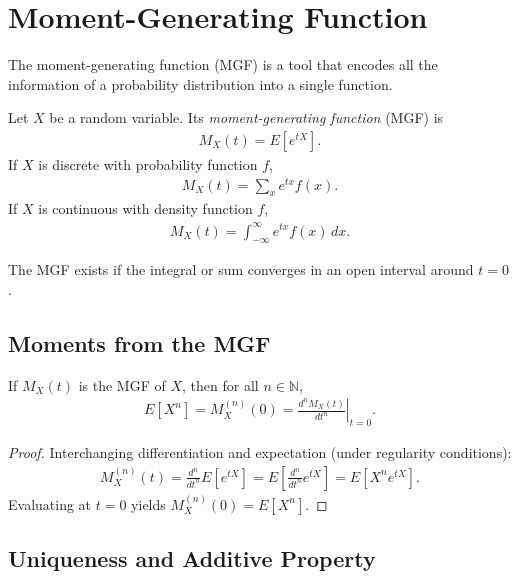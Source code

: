 \section{Moment-Generating Function}
\label{sec:mgf}\label{sec:3.4}

The moment-generating function (MGF) is a tool that encodes all the information of a probability distribution into a single function.

\begin{definicion}
Let $X$ be a random variable. Its \emph{moment-generating function} (MGF) is
\begin{align}
 \label{eq:2.8.11}
 M_X(t) = E\!\left[e^{tX}\right].
\end{align}
If $X$ is discrete with probability function $f$,
\begin{align}
 M_X(t) = \sum_x e^{tx} f(x).
\end{align}
If $X$ is continuous with density function $f$,
\begin{align}
 M_X(t) = \int_{-\infty}^{\infty} e^{tx} f(x)\,dx.
\end{align}
\end{definicion}

The MGF exists if the integral or sum converges in an open interval around $t=0$.

\subsection{Moments from the MGF}

\begin{teorema}
If $M_X(t)$ is the MGF of $X$, then for all $n \in \mathbb{N}$,
\begin{align}
 \label{eq:2.8.12}
 E\!\left[X^n\right] = M_X^{(n)}(0) = \left.\frac{d^n M_X(t)}{dt^n}\right|_{t=0}.
\end{align}
\end{teorema}

\begin{proof}
Interchanging differentiation and expectation (under regularity conditions):
\begin{align}
 M_X^{(n)}(t) = \frac{d^n}{dt^n}E[e^{tX}] = E\!\left[\frac{d^n}{dt^n}e^{tX}\right]
 = E\!\left[X^n e^{tX}\right].
\end{align}
Evaluating at $t=0$ yields $M_X^{(n)}(0) = E[X^n]$.
\end{proof}

\subsection{Uniqueness and Additive Property}

